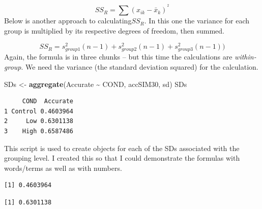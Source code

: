 \documentclass[
  11pt,
]{book}
\newenvironment{Shaded}{\begin{snugshade}}{\end{snugshade}}
\newcommand{\DecValTok}[1]{\textcolor[rgb]{0.06,0.06,0.06}{#1}}
\newcommand{\FunctionTok}[1]{\textcolor[rgb]{0.27,0.27,0.27}{\textbf{#1}}}
\newcommand{\NormalTok}[1]{#1}
\newcommand{\OtherTok}[1]{\textcolor[rgb]{0.37,0.37,0.37}{#1}}
\newcommand{\SpecialCharTok}[1]{\textcolor[rgb]{0.43,0.43,0.43}{\textbf{#1}}}
\begin{document}
\[SS_{R}= \sum(x_{ik}-\bar{x}_{k})^{^{2}}\] Below is another approach to calculating\(SS_R\). In this one the variance for each group is multiplied by its respective degrees of freedom, then summed.

\[SS_{R}= s_{group1}^{2}(n-1) + s_{group2}^{2}(n-1) + s_{group3}^{2}(n-1))\] Again, the formula is in three chunks -- but this time the calculations are \emph{within-group}. We need the variance (the standard deviation squared) for the calculation.

\begin{Shaded}
\begin{Highlighting}[]
\NormalTok{SDs }\OtherTok{\textless{}{-}} \FunctionTok{aggregate}\NormalTok{(Accurate }\SpecialCharTok{\textasciitilde{}}\NormalTok{ COND, accSIM30, sd)}
\NormalTok{SDs}
\end{Highlighting}
\end{Shaded}

\begin{verbatim}
     COND  Accurate
1 Control 0.4603964
2     Low 0.6301138
3    High 0.6587486
\end{verbatim}

This script is used to create objects for each of the SDs associated with the grouping level. I created this so that I could demonstrate the formulas with words/terms as well as with numbers.

\begin{Shaded}
\end{Shaded}

\begin{verbatim}
[1] 0.4603964
\end{verbatim}

\begin{Shaded}
\end{Shaded}

\begin{verbatim}
[1] 0.6301138
\end{verbatim}
\end{document}
